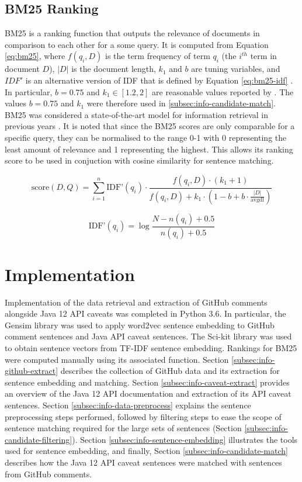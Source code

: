\subsection{BM25 Ranking}
\label{subsec:info-bm25}
BM25 is a ranking function that outputs the relevance of documents in comparison to each other for a some query. It is computed from Equation \ref{eq:bm25}, where $f(q_i, D)$ is the term frequency of term $q_i$ (the $i^{th}$ term in document $D$), $|D|$ is the document length, $k_1$ and $b$ are tuning variables, and $IDF'$ is an alternative version of IDF that is defined by Equation \ref{eq:bm25-idf} \cite{Manning:2008:IIR:1394399}. In particular, $b=0.75$ and $k_1 \in [1.2,2]$ are reasonable values reported by \citeauthor{Manning:2008:IIR:1394399}. The values $b=0.75$ and $k_1$ were therefore used in \ref{subsec:info-candidate-match}. BM25 was considered a state-of-the-art model for information retrieval in previous years \cite{perez2009integrating}. It is noted that since the BM25 scores are only comparable for a specific query, they can be normalised to the range 0-1 with 0 representing the least amount of relevance and 1 representing the highest. This allows its ranking score to be used in conjuction with cosine similarity for sentence matching.

\begin{equation} \label{eq:bm25} 
\text{score}(D,Q) = \sum_{i=1}^{n} \text{IDF'}(q_i) \cdot \frac{f(q_i, D) \cdot (k_1 + 1)}{f(q_i, D) + k_1 \cdot (1 - b + b \cdot \frac{|D|}{\text{avgdl}})} 
\end{equation}

\begin{equation} \label{eq:bm25-idf} 
\text{IDF'}(q_i) = \log{\frac{N - n(q_i) + 0.5}{n(q_i) + 0.5}}
\end{equation}

\section{Implementation}
\label{sec:info-implement}
Implementation of the data retrieval and extraction of GitHub comments alongside Java 12 API caveats was completed in Python 3.6. In particular, the Gensim library was used to apply word2vec sentence embedding to GitHub comment sentences and Java API caveat sentences. The Sci-kit library was used to obtain sentence vectors from TF-IDF sentence embedding. Rankings for BM25 were computed manually using its associated function. Section \ref{subsec:info-github-extract} describes the collection of GitHub data and its extraction for sentence embedding and matching. Section \ref{subsec:info-caveat-extract} provides an overview of the Java 12 API documentation and extraction of its API caveat sentences. Section \ref{subsec:info-data-preprocess} explains the sentence preprocessing steps performed, followed by filtering steps to ease the scope of sentence matching required for the large sets of sentences (Section \ref{subsec:info-candidate-filtering}). Section \ref{subsec:info-sentence-embedding} illustrates the tools used for sentence embedding, and finally, Section \ref{subsec:info-candidate-match} describes how the Java 12 API caveat sentences were matched with sentences from GitHub comments.

